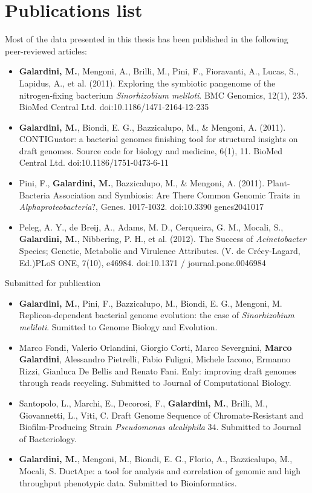 
\chapter{Publications list}

Most of the data presented in this thesis has been published in the following peer-reviewed articles:

\begin{itemize}
\item \textbf{Galardini, M.}, Mengoni, A., Brilli, M., Pini, F., Fioravanti, A., Lucas, S., Lapidus, A., et al. (2011). Exploring the symbiotic pangenome of the nitrogen-fixing bacterium \textit{Sinorhizobium meliloti}. BMC Genomics, 12(1), 235. BioMed Central Ltd. doi:10.1186/1471-2164-12-235
\item \textbf{Galardini, M.}, Biondi, E. G., Bazzicalupo, M., \& Mengoni, A. (2011). CONTIGuator: a bacterial genomes finishing tool for structural insights on draft genomes. Source code for biology and medicine, 6(1), 11. BioMed Central Ltd. doi:10.1186/1751-0473-6-11
\item Pini, F., \textbf{Galardini, M.}, Bazzicalupo, M., \& Mengoni, A. (2011). Plant-Bacteria Association and Symbiosis: Are There Common Genomic Traits in \textit{Alphaproteobacteria}?, Genes. 1017-1032. doi:10.3390 genes2041017
\item Peleg, A. Y., de Breij, A., Adams, M. D., Cerqueira, G. M., Mocali, S., \textbf{Galardini, M.}, Nibbering, P. H., et al. (2012). The Success of \textit{Acinetobacter} Species; Genetic, Metabolic and Virulence Attributes. (V. de Crécy-Lagard, Ed.)PLoS ONE, 7(10), e46984. doi:10.1371 / journal.pone.0046984
\end{itemize}

Submitted for publication

\begin{itemize}
\item \textbf{Galardini, M.}, Pini, F., Bazzicalupo, M., Biondi, E. G., Mengoni, M. Replicon-dependent bacterial genome evolution: the case of \textit{Sinorhizobium meliloti}. Sumitted to Genome Biology and Evolution.
\item Marco Fondi, Valerio Orlandini, Giorgio Corti, Marco Severgnini, \textbf{Marco Galardini}, Alessandro Pietrelli, Fabio Fuligni, Michele Iacono, Ermanno Rizzi, Gianluca De Bellis and Renato Fani. Enly: improving draft genomes through reads recycling. Submitted to Journal of Computational Biology.
\item Santopolo, L., Marchi, E., Decorosi, F., \textbf{Galardini, M.}, Brilli, M., Giovannetti, L., Viti, C. Draft Genome Sequence of Chromate-Resistant and Biofilm-Producing Strain \textit{Pseudomonas alcaliphila} 34. Submitted to Journal of Bacteriology.
\item \textbf{Galardini, M.}, Mengoni, M., Biondi, E. G., Florio, A., Bazzicalupo, M., Mocali, S. DuctApe: a tool for analysis and correlation of genomic and high throughput phenotypic data. Submitted to Bioinformatics.
\end{itemize}

